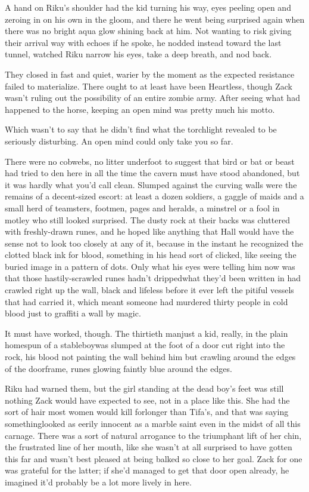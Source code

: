 A hand on Riku's shoulder had the kid turning his way, eyes peeling open and zeroing in on his own in the gloom, and there he went being surprised again when there was no bright aqua glow shining back at him. Not wanting to risk giving their arrival way with echoes if he spoke, he nodded instead toward the last tunnel, watched Riku narrow his eyes, take a deep breath, and nod back.

They closed in fast and quiet, warier by the moment as the expected resistance failed to materialize. There ought to at least have been Heartless, though Zack wasn't ruling out the possibility of an entire zombie army. After seeing what had happened to the horse, keeping an open mind was pretty much his motto.

Which wasn't to say that he didn't find what the torchlight revealed to be seriously disturbing. An open mind could only take you so far.

There were no cobwebs, no litter underfoot to suggest that bird or bat or beast had tried to den here in all the time the cavern must have stood abandoned, but it was hardly what you'd call clean. Slumped against the curving walls were the remains of a decent-sized escort: at least a dozen soldiers, a gaggle of maids and a small herd of teamsters, footmen, pages and heralds, a minstrel or a fool in motley who still looked surprised. The dusty rock at their backs was cluttered with freshly-drawn runes, and he hoped like anything that Hall would have the sense not to look too closely at any of it, because in the instant he recognized the clotted black ink for blood, something in his head sort of clicked, like seeing the buried image in a pattern of dots. Only what his eyes were telling him now was that those hastily-scrawled runes hadn't dripped\textemdash what they'd been written in had crawled right up the wall, black and lifeless before it ever left the pitiful vessels that had carried it, which meant someone had murdered thirty people in cold blood just to graffiti a wall by magic.

It must have worked, though. The thirtieth man\textemdash just a kid, really, in the plain homespun of a stableboy\textemdash was slumped at the foot of a door cut right into the rock, his blood not painting the wall behind him but crawling around the edges of the doorframe, runes glowing faintly blue around the edges.

Riku had warned them, but the girl standing at the dead boy's feet was still nothing Zack would have expected to see, not in a place like this. She had the sort of hair most women would kill for\textemdash longer than Tifa's, and that was saying something\textemdash looked as eerily innocent as a marble saint even in the midst of all this carnage. There was a sort of natural arrogance to the triumphant lift of her chin, the frustrated line of her mouth, like she wasn't at all surprised to have gotten this far and wasn't best pleased at being balked so close to her goal. Zack for one was grateful for the latter; if she'd managed to get that door open already, he imagined it'd probably be a lot more lively in here.

